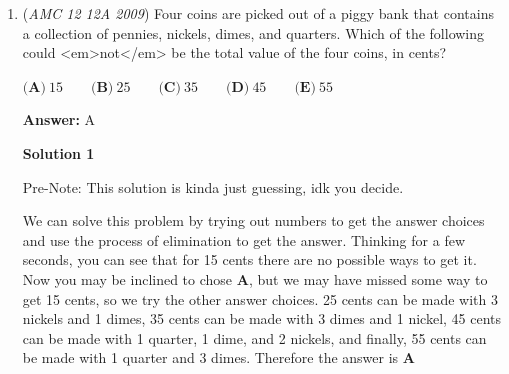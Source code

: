 \begin{enumerate}
 $\textbf{(A)}\ \frac {1}{3} \qquad \textbf{(B)}\ \frac {5}{12} \qquad \textbf{(C)}\ \frac {1}{2} \qquad \textbf{(D)}\ \frac {7}{12} \qquad \textbf{(E)}\ \frac {2}{3}$

 \textbf{Answer: }B



\textbf{Solution 1}

We can rewrite the two given fractions as $\frac 3{12}$ and $\frac 9{12}$. (We multiplied all numerators and denominators by $3$.)

 Now it is obvious that the interval between them is divided into three parts by the fractions $\boxed{\frac 5{12}}$ and $\frac 7{12}$.

 



\textbf{Solution 2}

The number we seek can be obtained as a weighted average of the two endpoints, where the closer one has weight $2$ and the further one $1$. We compute:

 
 \[\dfrac{ 2\cdot\frac 14 + 1\cdot\frac 34 }3 = \dfrac{ \frac 54 }3 = \boxed{\dfrac 5{12}}\]



	\item (\textit{AMC 12 12A 2009}) Four coins are picked out of a piggy bank that contains a collection of pennies, nickels, dimes, and quarters. Which of the following could <em>not</em> be the total value of the four coins, in cents?


 $\textbf{(A)}\ 15 \qquad \textbf{(B)}\ 25 \qquad \textbf{(C)}\ 35 \qquad \textbf{(D)}\ 45 \qquad \textbf{(E)}\ 55$

 \textbf{Answer: }A



\textbf{Solution 1}

Pre-Note: This solution is kinda just guessing, idk you decide.

 We can solve this problem by trying out numbers to get the answer choices and use the process of elimination to get the answer. Thinking for a few seconds, you can see that for 15 cents there are no possible ways to get it. Now you may be inclined to chose $\textbf{A}$, but we may have missed some way to get 15 cents, so we try the other answer choices. 25 cents can be made with 3 nickels and 1 dimes, 35 cents can be made with 3 dimes and 1 nickel, 45 cents can be made with 1 quarter, 1 dime, and 2 nickels, and finally, 55 cents can be made with 1 quarter and 3 dimes. Therefore the answer is $\boxed{\textbf{A}}$


\end{enumerate}

